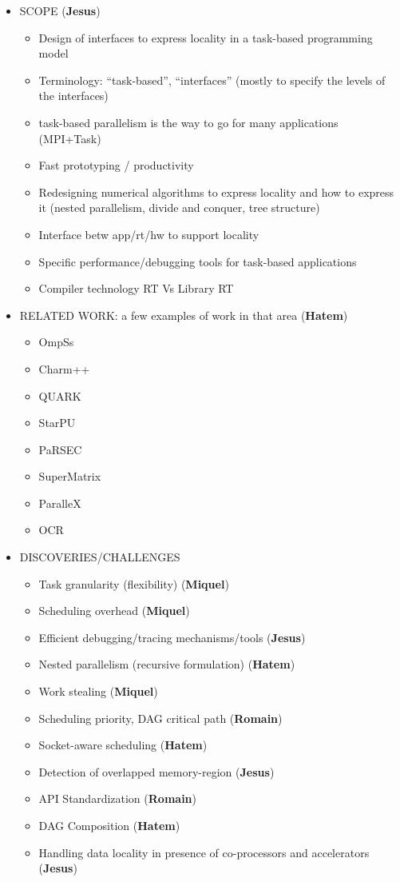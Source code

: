 \begin{itemize}
	
	
	\item SCOPE (\textbf{Jesus})
	\begin{itemize}
		\item Design of interfaces to express
		      locality in a task-based programming model
		\item Terminology: ``task-based'', ``interfaces'' (mostly to specify the levels of the interfaces)
		\item task-based parallelism is the way to go for many applications (MPI+Task)
		\item Fast prototyping / productivity
		\item Redesigning numerical algorithms to express locality 
		and how to express it (nested parallelism, divide and conquer, tree structure)
		\item Interface betw app/rt/hw to support locality
		\item Specific performance/debugging tools for task-based applications
		\item Compiler technology RT Vs Library RT
	\end{itemize}
	
	
	
	\item RELATED WORK: a few examples of work in that area  (\textbf{Hatem})
	\begin{itemize}
		\item OmpSs
		\item Charm++
		\item QUARK
		\item StarPU
		\item PaRSEC
		\item SuperMatrix
		\item ParalleX
		\item OCR
	\end{itemize}



	\item DISCOVERIES/CHALLENGES
	\begin{itemize}
		\item Task granularity (flexibility) (\textbf{Miquel})
		\item Scheduling overhead (\textbf{Miquel})
		\item Efficient debugging/tracing mechanisms/tools (\textbf{Jesus})
		\item Nested parallelism (recursive formulation) (\textbf{Hatem})
		\item Work stealing (\textbf{Miquel})
		\item Scheduling priority, DAG critical path  (\textbf{Romain})
		\item Socket-aware scheduling (\textbf{Hatem})
		\item Detection of overlapped memory-region (\textbf{Jesus})
		\item API Standardization (\textbf{Romain})
		\item DAG Composition (\textbf{Hatem})
		\item Handling data locality in presence of co-processors and accelerators (\textbf{Jesus})
	\end{itemize}
			

\end{itemize}
